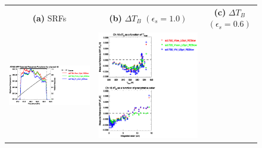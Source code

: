 \begin{figure}[H]
  \centering
  \begin{tabular}{c c c}
    \textsf{\textbf{(a)} SRFs} &
    \textsf{\textbf{(b)} $\Delta T_B$ $(\epsilon_s = 1.0)$} &
    \textsf{\textbf{(c)} $\Delta T_B$ $(\epsilon_s = 0.6)$} \\
    \includegraphics[bb=80 400 280 558,clip,scale=0.85]{graphics/srf/Vset/atms_npp.ch16.osrf.eps} &
    \includegraphics[bb=85 400 260 558,clip,scale=0.85]{graphics/dtb/Vset/e1.0_r0.0/atms_npp.ch16.dTb.eps} & 

\end{tabular}
\end{figure}
